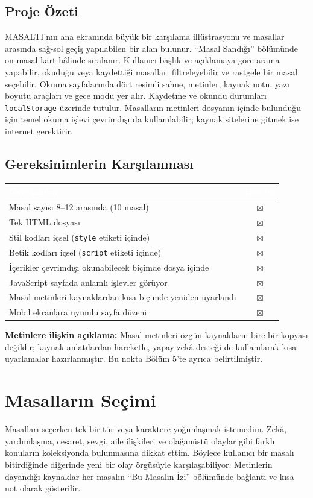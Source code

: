 \documentclass[12pt,a4paper]{article}
\begin{document}
\subsection{Proje Özeti}
MASALTI'nın ana ekranında büyük bir karşılama illüstrasyonu ve masallar arasında sağ-sol geçiş yapılabilen bir alan bulunur. ``Masal Sandığı'' bölümünde on masal kart hâlinde sıralanır. Kullanıcı başlık ve açıklamaya göre arama yapabilir, okuduğu veya kaydettiği masalları filtreleyebilir ve rastgele bir masal seçebilir. Okuma sayfalarında dört resimli sahne, metinler, kaynak notu, yazı boyutu araçları ve gece modu yer alır. Kaydetme ve okundu durumları \texttt{localStorage} üzerinde tutulur. Masalların metinleri dosyanın içinde bulunduğu için temel okuma işlevi çevrimdışı da kullanılabilir; kaynak sitelerine gitmek ise internet gerektirir.

\subsection{Gereksinimlerin Karşılanması}
\begin{center}
\begin{tabular}{@{}p{10.1cm}c@{}}
\toprule
\rowcolor{ana}\textcolor{white}{\textbf{Gereksinim}} & \textcolor{white}{\textbf{Durum}} \\
\midrule
Masal sayısı 8--12 arasında (10 masal) & $\boxtimes$ \\
Tek HTML dosyası & $\boxtimes$ \\
Stil kodları içsel (\texttt{style} etiketi içinde) & $\boxtimes$ \\
Betik kodları içsel (\texttt{script} etiketi içinde) & $\boxtimes$ \\
İçerikler çevrimdışı okunabilecek biçimde dosya içinde & $\boxtimes$ \\
JavaScript sayfada anlamlı işlevler görüyor & $\boxtimes$ \\
Masal metinleri kaynaklardan kısa biçimde yeniden uyarlandı & $\boxtimes$ \\
Mobil ekranlara uyumlu sayfa düzeni & $\boxtimes$ \\
\bottomrule
\end{tabular}
\end{center}
\textbf{Metinlere ilişkin açıklama:} Masal metinleri özgün kaynakların bire bir kopyası değildir; kaynak anlatılardan hareketle, yapay zekâ desteği de kullanılarak kısa uyarlamalar hazırlanmıştır. Bu nokta Bölüm 5'te ayrıca belirtilmiştir.

\section{Masalların Seçimi}
Masalları seçerken tek bir tür veya karaktere yoğunlaşmak istemedim. Zekâ, yardımlaşma, cesaret, sevgi, aile ilişkileri ve olağanüstü olaylar gibi farklı konuların koleksiyonda bulunmasına dikkat ettim. Böylece kullanıcı bir masalı bitirdiğinde diğerinde yeni bir olay örgüsüyle karşılaşabiliyor. Metinlerin dayandığı kaynaklar her masalın ``Bu Masalın İzi'' bölümünde bağlantı ve kısa not olarak gösterilir.
\end{document}

